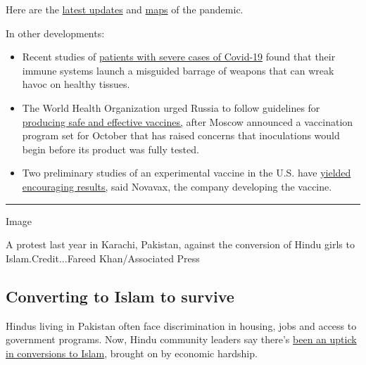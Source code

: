 Here are the
\href{https://www.nytimes3xbfgragh.onion/2020/08/04/world/coronavirus-covid-19.html?action=click\&module=Top\%20Stories\&pgtype=Homepage}{latest
updates} and
\href{https://www.nytimes3xbfgragh.onion/interactive/2020/world/coronavirus-maps.html}{maps}
of the pandemic.

In other developments:

\begin{itemize}
\item
  Recent studies of
  \href{https://www.nytimes3xbfgragh.onion/2020/08/04/health/coronavirus-immune-system.html}{patients
  with severe cases of Covid-19} found that their immune systems launch
  a misguided barrage of weapons that can wreak havoc on healthy
  tissues.
\item
  The World Health Organization urged Russia to follow guidelines for
  \href{https://www.nytimes3xbfgragh.onion/2020/08/04/world/coronavirus-covid-19.html?action=click\&module=Top\%20Stories\&pgtype=Homepage\#link-7bfa12a5}{producing
  safe and effective vaccines,} after Moscow announced a vaccination
  program set for October that has raised concerns that inoculations
  would begin before its product was fully tested.
\item
  Two preliminary studies of an experimental vaccine in the U.S. have
  \href{https://www.nytimes3xbfgragh.onion/2020/08/04/world/coronavirus-cases.html?action=click\&module=Top\%20Stories\&pgtype=Homepage\#link-1228a480}{yielded
  encouraging results,} said Novavax, the company developing the
  vaccine.
\end{itemize}

\begin{center}\rule{0.5\linewidth}{\linethickness}\end{center}

Image

A protest last year in Karachi, Pakistan, against the conversion of
Hindu girls to Islam.Credit...Fareed Khan/Associated Press

\hypertarget{converting-to-islam-to-survive}{%
\subsection{Converting to Islam to
survive}\label{converting-to-islam-to-survive}}

Hindus living in Pakistan often face discrimination in housing, jobs and
access to government programs. Now, Hindu community leaders say there's
\href{https://www.nytimes3xbfgragh.onion/2020/08/04/world/asia/pakistan-hindu-conversion.html}{been
an uptick in conversions to Islam}, brought on by economic hardship.

